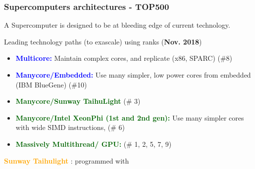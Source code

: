 \begin{frame}
  \frametitle{Supercomputers architectures - TOP500}

  A Supercomputer is designed to be at bleeding edge of current technology.

  { Leading technology paths (to exascale) using  ranks ({\bf Nov. 2018})}
  \begin{itemize}
  \item \textcolor{blue}{\textbf{Multicore:}} Maintain complex cores, and replicate (x86, SPARC) (\#8)
  \item \textcolor{blue}{\textbf{Manycore/Embedded:}} Use many simpler, low power cores from embedded (IBM BlueGene) (\#10)
  \item \textcolor{darkgreen}{\textbf{Manycore/Sunway TaihuLight}} (\# 3)
  \item \textcolor{darkgreen}{\textbf{Manycore/Intel XeonPhi (1st and 2nd gen):}} Use many simpler cores with wide SIMD instructions, (\# 6)
  \item \textcolor{darkgreen}{\textbf{Massively Multithread/ GPU:}}  (\# 1, 2, 5, 7, 9)
  \end{itemize}

  \textcolor{orange}{\textbf{Sunway Taihulight}} : programmed with 


\end{frame}

